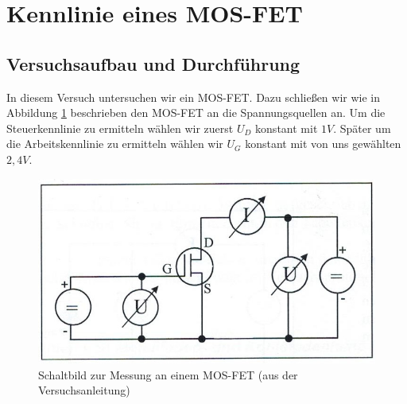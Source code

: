 \documentclass{scrartcl}
\begin{document}
\pagebreak
\section{Kennlinie eines MOS-FET}
\subsection{Versuchsaufbau und Durchführung}
In diesem Versuch untersuchen wir ein MOS-FET. Dazu schließen wir wie in Abbildung \ref{fig:Aufbau4} beschrieben den MOS-FET an die Spannungsquellen an. Um die Steuerkennlinie zu ermitteln wählen wir zuerst $U_D$ konstant mit $1V$. Später um die Arbeitskennlinie zu ermitteln wählen wir $U_G$ konstant mit von uns gewählten $2,4V$. 
\begin{figure}[H]
  \centering
    \includegraphics[scale=0.75]{Aufbau4.JPG}
  \caption{Schaltbild zur Messung an einem MOS-FET (aus der Versuchsanleitung)}
  \label{fig:Aufbau4}
\end{figure}
\end{document}

